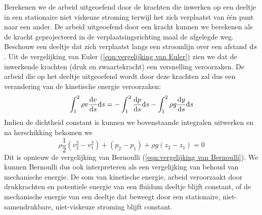 Berekenen we de arbeid uitgeoefend door de krachten die inwerken op een deeltje in een stationaire niet viskeuze stroming terwijl het zich verplaatst van één punt naar een ander. De arbeid uitgeoefend door een kracht kunnen we berekenen als de kracht geprojecteerd in de verplaatsingsrichting maal de afgelegde weg. Beschouw een deeltje dat zich verplaatst langs een stroomlijn over een afstand $\mathrm{d} s$. Uit de vergelijking van Euler (\ref{eqn:vergelijking van Euler}) zien we dat de inwerkende krachten (druk en zwaartekracht) een versnelling veroorzaken. De arbeid die op het deeltje uitgeoefend wordt door deze krachten zal dus een verandering van de kinetische energie veroorzaken:
\begin{equation}
	\int_1^2 \rho v \frac{\mathrm{d} v}{\mathrm{d} s} \mathrm{d} s = - \int_1^2 \frac{\mathrm{d} p}{\mathrm{d} s} \mathrm{d} s - \int_1^2 \rho g \frac{\mathrm{d} y}{\mathrm{d} s} \mathrm{d} s
\end{equation}
Indien de dichtheid constant is kunnen we bovenstaande integralen uitwerken en na herschikking bekomen we
\begin{equation}
	\rho \frac{1}{2} (v_2^2-v_1^2) + (p_2-p_1) + \rho g (z_2-z_1) = 0
	\label{eqn:kinetische energie en arbeid}
\end{equation}
Dit is opnieuw de vergelijking van Bernoulli (\ref{eqn:vergelijking van Bernoulli}). We kunnen Bernoulli dus ook interpreteren als een vergelijking van behoud van mechanische energie. De som van kinetische energie, arbeid veroorzaakt door drukkrachten en potentiele energie van een fluïdum deeltje blijft constant, of de mechanische energie van een deeltje dat beweegt door een stationaire, niet-samendrukbare, niet-viskeuze stroming blijft constant.

